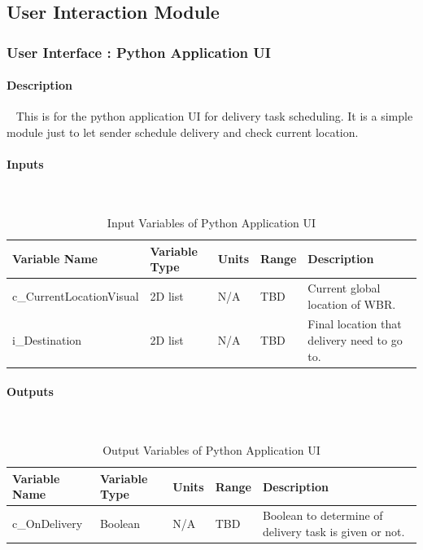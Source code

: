 \documentclass[12pt]{article}
\begin{document}
    \subsection{User Interaction Module}
        \subsubsection{User Interface : Python Application UI}
            \paragraph{Description}
            ~\newline
            This is for the python application UI for delivery task scheduling. It is a simple module just to let sender schedule delivery and check current location. 
            \paragraph{Inputs}
            ~\newline
                \begin{table}[H]
                  \centering
                    \caption{Input Variables of Python Application UI} 
                    \label{tbl:Input Variables of Python Application UI}
                  \begin{tabularx}{\textwidth}{|p{5cm}|p{1.2cm}|p{1.2cm}|p{1cm}|X|}
                    \hline Variable Name & Variable Type & Units & Range & Description \\
                    \hline c\_CurrentLocationVisual & 2D list &  N/A & TBD & Current global location of WBR.\\
                    \hline i\_Destination & 2D list  & N/A & TBD & Final location that delivery need to go to.\\
                    \hline
                  \end{tabularx}
                \end{table} 
            \paragraph{Outputs}
            ~\newline
                \begin{table}[H]
                  \centering
                    \caption{Output Variables of Python Application UI} \label{tbl:Output Variables of Python Application UI}
                  \begin{tabularx}{\textwidth}{|p{5cm}|p{1.2cm}|p{1.2cm}|p{1cm}|X|}
                    \hline Variable Name & Variable Type & Units & Range & Description \\
                    \hline c\_OnDelivery & Boolean &  N/A & TBD & Boolean to determine of delivery task is given or not.\\
                    \hline
                  \end{tabularx}
                \end{table} 
\end{document}
